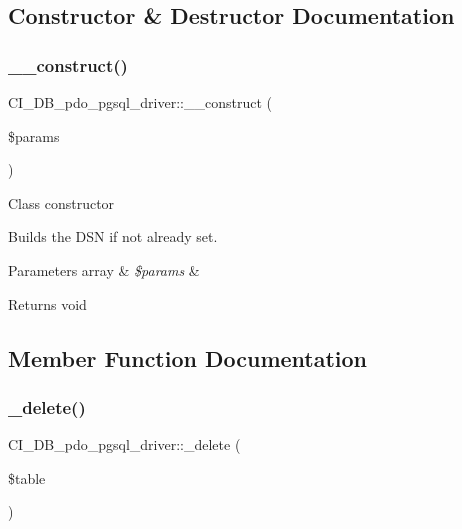 \subsection{Constructor \& Destructor Documentation}
\mbox{\label{class_c_i___d_b__pdo__pgsql__driver_ade44bd4f73b0a3cc69bdb4c1a0388aed}} 
\subsubsection{\texorpdfstring{\+\_\+\+\_\+construct()}{\_\_construct()}}
{\footnotesize\ttfamily C\+I\+\_\+\+D\+B\+\_\+pdo\+\_\+pgsql\+\_\+driver\+::\+\_\+\+\_\+construct (\begin{DoxyParamCaption}\item[{}]{\$params }\end{DoxyParamCaption})}

Class constructor

Builds the D\+SN if not already set.


\begin{DoxyParams}[1]{Parameters}
array & {\em \$params} & \\
\hline
\end{DoxyParams}
\begin{DoxyReturn}{Returns}
void 
\end{DoxyReturn}


\subsection{Member Function Documentation}
\mbox{\label{class_c_i___d_b__pdo__pgsql__driver_a2d33f0da7617fe426bf7f65cd51a78db}} 
\subsubsection{\texorpdfstring{\+\_\+delete()}{\_delete()}}
{\footnotesize\ttfamily C\+I\+\_\+\+D\+B\+\_\+pdo\+\_\+pgsql\+\_\+driver\+::\+\_\+delete (\begin{DoxyParamCaption}\item[{}]{\$table }\end{DoxyParamCaption})\hspace{0.3cm}{\ttfamily [protected]}}

